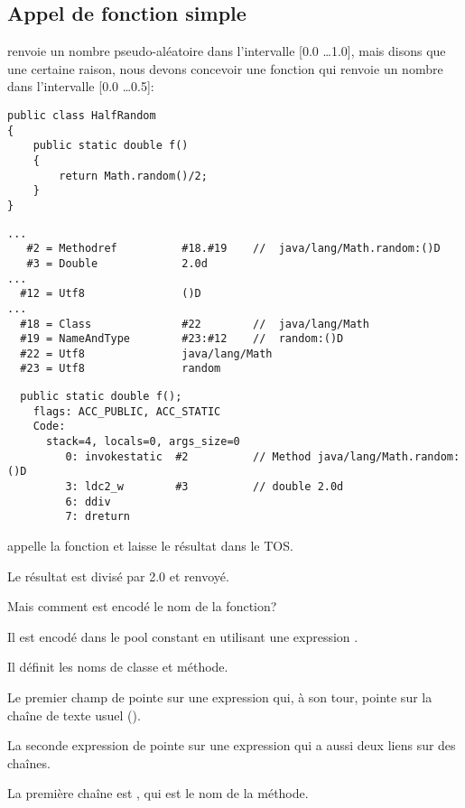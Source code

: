 \subsection{Appel de fonction simple}

 renvoie un nombre pseudo-aléatoire dans l'intervalle [0.0 \dots 1.0],
mais disons que une certaine raison, nous devons concevoir une fonction qui renvoie
un nombre dans l'intervalle [0.0 \dots 0.5]:


\begin{lstlisting}[style=customjava]
public class HalfRandom
{ 
	public static double f()
	{
		return Math.random()/2;
	}
}
\end{lstlisting}

\begin{lstlisting}[caption=Constant pool]
...
   #2 = Methodref          #18.#19    //  java/lang/Math.random:()D
   #3 = Double             2.0d
...
  #12 = Utf8               ()D
...
  #18 = Class              #22        //  java/lang/Math
  #19 = NameAndType        #23:#12    //  random:()D
  #22 = Utf8               java/lang/Math
  #23 = Utf8               random
\end{lstlisting}

\begin{lstlisting}
  public static double f();
    flags: ACC_PUBLIC, ACC_STATIC
    Code:
      stack=4, locals=0, args_size=0
         0: invokestatic  #2          // Method java/lang/Math.random:()D
         3: ldc2_w        #3          // double 2.0d
         6: ddiv
         7: dreturn
\end{lstlisting}

 appelle la fonction  et laisse le résultat dans
le \ac{TOS}.

Le résultat est divisé par 2.0 et renvoyé.

Mais comment est encodé le nom de la fonction?

Il est encodé dans le pool constant en utilisant une expression .

Il définit les noms de classe et méthode.

Le premier champ de  pointe sur une expression  qui, à son
tour, pointe sur la chaîne de texte usuel ().

La seconde expression de  pointe sur une expression 
qui a aussi deux liens sur des chaînes.

La première chaîne est , qui est le nom de la méthode.

